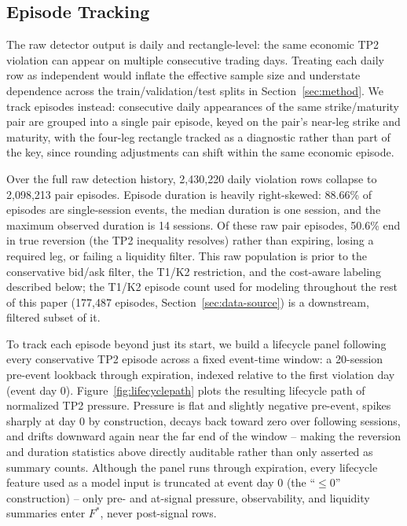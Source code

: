 \documentclass[sigconf,review,anonymous]{acmart}
\begin{document}
\subsection{Episode Tracking}
\label{sec:episode-tracking}
The raw detector output is daily and rectangle-level: the same economic TP2 violation can appear on multiple consecutive trading days. Treating each daily row as independent would inflate the effective sample size and understate dependence across the train/validation/test splits in Section~\ref{sec:method}. We track episodes instead: consecutive daily appearances of the same strike/maturity pair are grouped into a single pair episode, keyed on the pair's near-leg strike and maturity, with the four-leg rectangle tracked as a diagnostic rather than part of the key, since rounding adjustments can shift within the same economic episode.

Over the full raw detection history, 2{,}430{,}220 daily violation rows collapse to 2{,}098{,}213 pair episodes. Episode duration is heavily right-skewed: 88.66\% of episodes are single-session events, the median duration is one session, and the maximum observed duration is 14 sessions. Of these raw pair episodes, 50.6\% end in true reversion (the TP2 inequality resolves) rather than expiring, losing a required leg, or failing a liquidity filter. This raw population is prior to the conservative bid/ask filter, the T1/K2 restriction, and the cost-aware labeling described below; the T1/K2 episode count used for modeling throughout the rest of this paper (177{,}487 episodes, Section~\ref{sec:data-source}) is a downstream, filtered subset of it.

To track each episode beyond just its start, we build a lifecycle panel following every conservative TP2 episode across a fixed event-time window: a 20-session pre-event lookback through expiration, indexed relative to the first violation day (event day 0). Figure~\ref{fig:lifecyclepath} plots the resulting lifecycle path of normalized TP2 pressure. Pressure is flat and slightly negative pre-event, spikes sharply at day 0 by construction, decays back toward zero over following sessions, and drifts downward again near the far end of the window -- making the reversion and duration statistics above directly auditable rather than only asserted as summary counts. Although the panel runs through expiration, every lifecycle feature used as a model input is truncated at event day 0 (the ``$\le0$'' construction) -- only pre- and at-signal pressure, observability, and liquidity summaries enter $F^{\ast}$, never post-signal rows.
\end{document}
